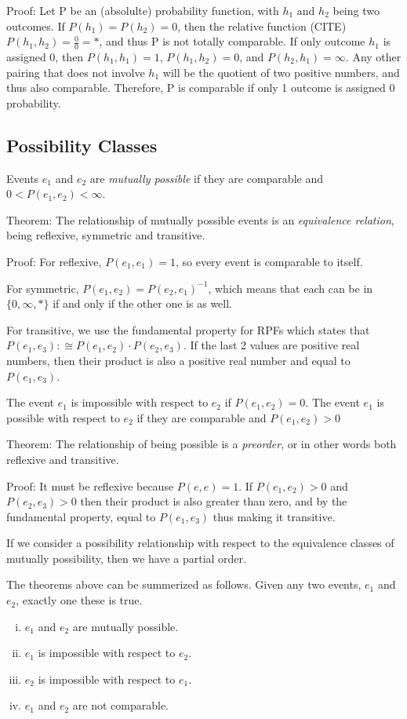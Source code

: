 \documentclass[twoside]{article}
\theoremstyle{plain}%
\theoremstyle{definition}
\theoremstyle{remark}
\begin{document}
Proof: Let P be an (absolulte) probability function, with \(h_1\) and \(h_2\) being two outcomes. If \(P(h_1) = P(h_2) = 0\), then the relative function (CITE) \(P(h_1, h_2) = \frac{0}{0} = \ast\), and thus P is not totally comparable. If only outcome \(h_1\) is assigned 0, then \(P(h_1, h_1) = 1\), \(P(h_1, h_2) = 0\), and \(P(h_2, h_1) = \infty\). Any other pairing that does not involve \(h_1\) will be the quotient of two positive numbers, and thus also comparable. Therefore, P is comparable if only 1 outcome is assigned 0 probability.

\subsection{Possibility Classes}

Events \(e_1\) and \(e_2\) are \textit{mutually possible} if they are comparable and \(0 < P(e_1, e_2) < \infty\).

Theorem: The relationship of mutually possible events is an \textit{equivalence relation}, being reflexive, symmetric and transitive.

Proof: For reflexive, \(P(e_1, e_1) = 1\), so every event is comparable to itself.

For symmetric, \(P(e_1, e_2) = P(e_2, e_1)^{-1}\), which means that each can be in \(\{0, \infty, \ast\}\) if and only if the other one is as well.

For transitive, we use the fundamental property for RPFs which states that \(P(e_1, e_3) :\cong P(e_1, e_2) \cdot P(e_2, e_3)\). If the last 2 values are positive real numbers, then their product is also a positive real number and equal to \(P(e_1, e_3)\).

The event \(e_1\) is impossible with respect to \(e_2\) if \(P(e_1, e_2) = 0\). The event \(e_1\) is possible with respect to \(e_2\) if they are comparable and \(P(e_1, e_2) > 0\)

Theorem: The relationship of being possible is a \textit{preorder}, or in other words both reflexive and transitive.

Proof: It must be reflexive because \(P(e, e) = 1\). If \(P(e_1, e_2) > 0\) and \(P(e_2, e_3) > 0\) then their product is also greater than zero, and by the fundamental property, equal to \(P(e_1, e_3)\) thus making it transitive.

If we consider a possibility relationship with respect to the equivalence classes of mutually possibility, then we have a partial order.

The theorems above can be summerized as follows. Given any two events, \(e_1\) and \(e_2\), exactly one these is true.
\begin{enumerate}[(i)]
  \item \(e_1\) and \(e_2\) are mutually possible.
  \item \(e_1\) is impossible with respect to \(e_2\).
  \item \(e_2\) is impossible with respect to \(e_1\).
  \item \(e_1\) and \(e_2\) are not comparable.
\end{enumerate}
\end{document}
